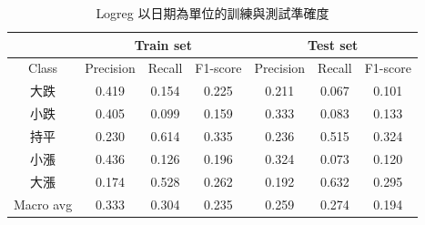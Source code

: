 \begin{table}[H]
\centering
{\fontsize{12.5}{16}\selectfont
\begin{tabular}{c|ccc|ccc}
& \multicolumn{3}{c|}{Train set} & \multicolumn{3}{c}{Test set} \\
\hline
Class & Precision & Recall & F1-score & Precision & Recall & F1-score \\
\hline
大跌 & 0.419 & 0.154 & 0.225 & 0.211 & 0.067 & 0.101 \\
小跌 & 0.405 & 0.099 & 0.159 & 0.333 & 0.083 & 0.133 \\
持平 & 0.230 & 0.614 & 0.335 & 0.236 & 0.515 & 0.324 \\
小漲 & 0.436 & 0.126 & 0.196 & 0.324 & 0.073 & 0.120 \\
大漲 & 0.174 & 0.528 & 0.262 & 0.192 & 0.632 & 0.295 \\
\hline
Macro avg & 0.333 & 0.304 & 0.235 & 0.259 & 0.274 & 0.194 \\
\end{tabular}
}
\caption{Logreg 以日期為單位的訓練與測試準確度}
\label{tab:classifier_1_report_logreg_non_filtered}
\end{table}